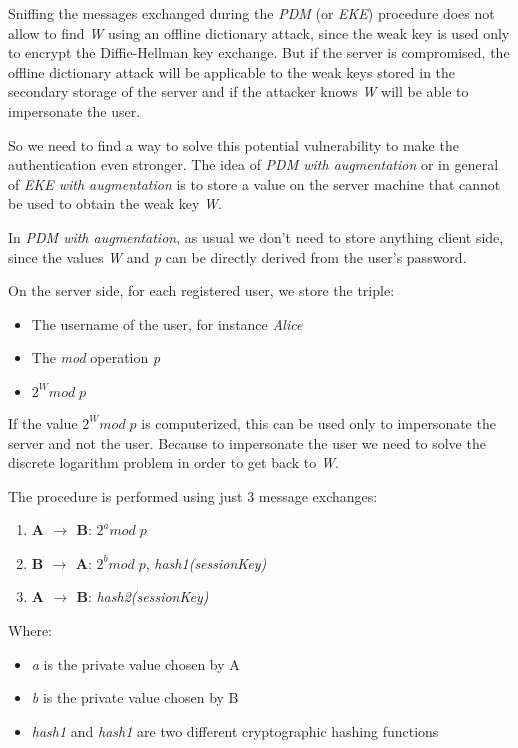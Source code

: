 \documentclass{article}
\begin{document}
Sniffing the messages exchanged during the  \emph{PDM} (or \emph{EKE}) procedure 
does not allow to find \emph{W} using an offline dictionary attack,
since the weak key is used only to encrypt the Diffie-Hellman key exchange.
But if the server is compromised, the offline dictionary attack  
will be applicable to the weak keys stored in the secondary storage of the server and
if the attacker knows \emph{W} will be able to impersonate the user.

So we need to find a way to solve this potential vulnerability to make the authentication even stronger.
The idea of  \emph{PDM with augmentation} or in general of \emph{EKE with augmentation} is to store a value on
the server machine that cannot be used to obtain the weak key \emph{W}.

In \emph{PDM with augmentation}, as usual we don't need to
store anything client side, since the values \emph{W} and \emph{p}
can be directly derived from the user's password.
 
\noindent On the server side, for each registered user, we store the triple:
 \begin{itemize}
 	\item The username of the user, for instance \emph{Alice}
 	\item The \emph{mod} operation \emph{p}
 	\item $2^W mod  \; p$
 \end{itemize}

If the value $2^W mod  \; p$ is computerized, this can be used only to impersonate
the server and not the user. Because to impersonate the user we need to solve
the discrete logarithm problem in order to get back to \emph{W}.

\noindent The procedure is performed using just 3 message exchanges:
 \begin{enumerate}
	\item \textbf{A $\rightarrow$ B}: $2^a mod  \; p$
	\item \textbf{B $\rightarrow$ A}: $2^b mod  \; p$, \emph{hash1(sessionKey)}
	\item \textbf{A $\rightarrow$ B}: \emph{hash2(sessionKey)}
\end{enumerate}

\noindent Where:
 \begin{itemize}
	\item \emph{a} is the private value chosen by A
	\item \emph{b} is the private value chosen by B
	\item \emph{hash1} and \emph{hash1} are two different cryptographic hashing functions
\end{itemize}
\end{document}
